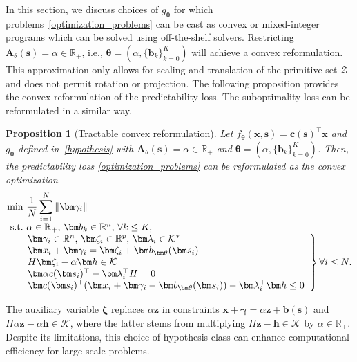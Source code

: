 \documentclass{article}
\theoremstyle{plain}
\newtheorem{proposition}[theorem]{Proposition}
\begin{document}
In this section, we discuss choices of $g_{\bm \theta}$ for which problems~\eqref{optimization_problems}  can be cast as convex or mixed-integer programs which can be solved using off-the-shelf solvers. Restricting $\bm A_\theta(\bm s) = \alpha \in\mathbb{R}_+$, i.e., $\bm\theta = (\alpha,\{\bm b_k\}_{k=0}^K)$ will achieve a convex reformulation. This approximation only allows for scaling and translation of the primitive set $\mathcal Z$ and does not permit rotation or projection.  The following proposition provides the convex reformulation of the predictability loss. The suboptimality loss can be reformulated in a similar way.
\begin{proposition}[Tractable convex reformulation]
Let $f_{\bm\theta}(\bm x, \bm s) = \bm c(\bm s)^\top \bm x$ and $g_{\bm\theta}$ defined in~\eqref{hypothesis} with $\bm A_\theta(\bm s) = \alpha\in\mathbb{R}_+$ and  $\bm\theta = (\alpha,\{\bm b_k\}_{k=0}^K)$. Then, the predictability loss \eqref{optimization_problems} can be reformulated as the convex optimization
\begin{equation}\label{convex:predictability} 
    \begin{array}{@{}r@{~}l@{}ll}
    \min   & \displaystyle\frac{1}{N} \sum_{i = 1}^N \|\bm \gamma_{i}\|\\
    \textnormal{s.t.}      &\alpha\in\mathbb{R}_+,\, \bm b_k\in\mathbb{R}^{n},\, \forall k\leq K,\\
    &\left.
    \!\!\!\begin{array}{l}
     \bm\gamma_i\in\mathbb{R}^n,\,\bm \zeta_i\in\mathbb{R}^p,\, \bm \lambda_i \in \mathcal K^*\\
    \bm x_i + \bm \gamma_{i} = \bm \zeta_i + \bm b_{\bm\theta}(\bm s_i)\\
     H\bm \zeta_i - \alpha\bm h \in \mathcal{K}\\
          \bm \alpha c(\bm s_i)^\top - \bm \lambda_i^\top H = 0 \\
     \bm c(\bm s_i)^\top(\bm x_i+\bm\gamma_{i}-\bm b_{\bm\theta}(\bm s_i)) - \bm \lambda_i^\top \bm h \leq 0\\
     \end{array}
    \right\}  \forall i\leq N.\\
    \end{array} 
\end{equation}
\end{proposition}
The auxiliary variable $\bm\zeta$ replaces $\alpha\bm z$ in constraints $\bm x+\bm \gamma = \alpha\bm z +\bm b(\bm s)$ and $H\alpha\bm z - \alpha\bm h\in\mathcal{K}$, where the latter stems from multiplying $H\bm z - \bm h\in\mathcal{K}$ by $\alpha\in\mathbb{R}_+$.   Despite its limitations, this choice of hypothesis class can enhance computational efficiency for large-scale problems.  
\end{document}
